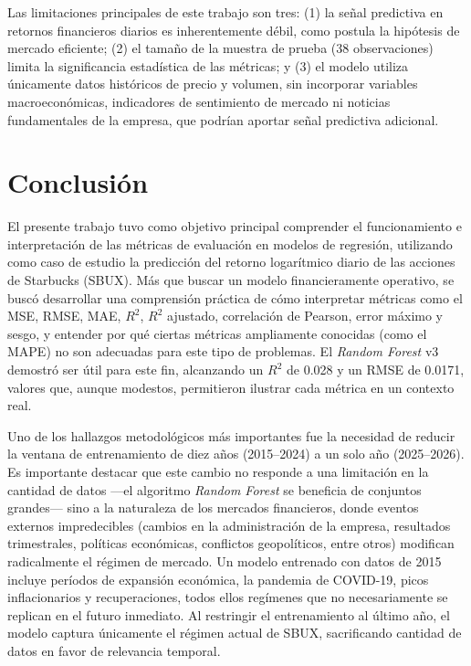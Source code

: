 \documentclass[12pt,a4paper]{article}
\begin{document}
Las limitaciones principales de este trabajo son tres: (1) la señal predictiva en retornos financieros diarios es inherentemente débil, como postula la hipótesis de mercado eficiente; (2) el tamaño de la muestra de prueba (38 observaciones) limita la significancia estadística de las métricas; y (3) el modelo utiliza únicamente datos históricos de precio y volumen, sin incorporar variables macroeconómicas, indicadores de sentimiento de mercado ni noticias fundamentales de la empresa, que podrían aportar señal predictiva adicional.

\newpage

\section{Conclusión}
\label{sec:conclusion}

El presente trabajo tuvo como objetivo principal comprender el funcionamiento e interpretación de las métricas de evaluación en modelos de regresión, utilizando como caso de estudio la predicción del retorno logarítmico diario de las acciones de Starbucks (SBUX). Más que buscar un modelo financieramente operativo, se buscó desarrollar una comprensión práctica de cómo interpretar métricas como el MSE, RMSE, MAE, $R^{2}$, $R^{2}$ ajustado, correlación de Pearson, error máximo y sesgo, y entender por qué ciertas métricas ampliamente conocidas (como el MAPE) no son adecuadas para este tipo de problemas. El \textit{Random Forest} v3 demostró ser útil para este fin, alcanzando un $R^{2}$ de 0.028 y un RMSE de 0.0171, valores que, aunque modestos, permitieron ilustrar cada métrica en un contexto real.

Uno de los hallazgos metodológicos más importantes fue la necesidad de reducir la ventana de entrenamiento de diez años (2015--2024) a un solo año (2025--2026). Es importante destacar que este cambio no responde a una limitación en la cantidad de datos ---el algoritmo \textit{Random Forest} se beneficia de conjuntos grandes--- sino a la naturaleza de los mercados financieros, donde eventos externos impredecibles (cambios en la administración de la empresa, resultados trimestrales, políticas económicas, conflictos geopolíticos, entre otros) modifican radicalmente el régimen de mercado. Un modelo entrenado con datos de 2015 incluye períodos de expansión económica, la pandemia de COVID-19, picos inflacionarios y recuperaciones, todos ellos regímenes que no necesariamente se replican en el futuro inmediato. Al restringir el entrenamiento al último año, el modelo captura únicamente el régimen actual de SBUX, sacrificando cantidad de datos en favor de relevancia temporal.
\end{document}
